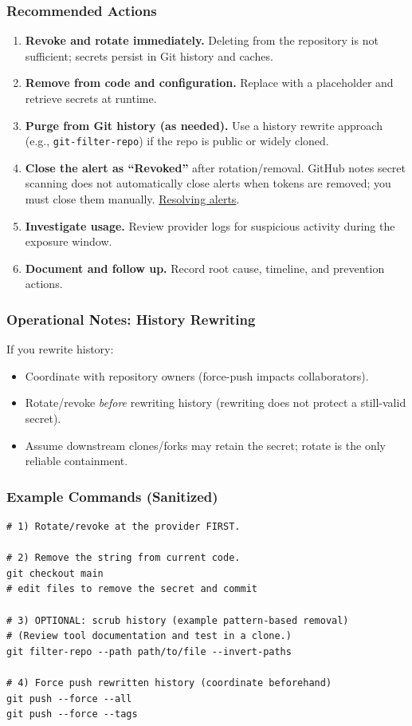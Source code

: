\documentclass[11pt]{article}
\newcommand{\code}[1]{\texttt{#1}}
\begin{document}
\subsubsection{Recommended Actions}
\begin{enumerate}
  \item \textbf{Revoke and rotate immediately.} Deleting from the repository is not sufficient; secrets persist in Git history and caches.
  \item \textbf{Remove from code and configuration.} Replace with a placeholder and retrieve secrets at runtime.
  \item \textbf{Purge from Git history (as needed).} Use a history rewrite approach (e.g., \code{git-filter-repo}) if the repo is public or widely cloned.
  \item \textbf{Close the alert as ``Revoked''} after rotation/removal. GitHub notes secret scanning does not automatically close alerts when tokens are removed; you must close them manually. \href{https://docs.github.com/code-security/secret-scanning/managing-alerts-from-secret-scanning/resolving-alerts}{Resolving alerts}.
  \item \textbf{Investigate usage.} Review provider logs for suspicious activity during the exposure window.
  \item \textbf{Document and follow up.} Record root cause, timeline, and prevention actions.
\end{enumerate}

\subsubsection{Operational Notes: History Rewriting}
If you rewrite history:
\begin{itemize}
  \item Coordinate with repository owners (force-push impacts collaborators).
  \item Rotate/revoke \emph{before} rewriting history (rewriting does not protect a still-valid secret).
  \item Assume downstream clones/forks may retain the secret; rotate is the only reliable containment.
\end{itemize}

\subsubsection{Example Commands (Sanitized)}
\begin{verbatim}
# 1) Rotate/revoke at the provider FIRST.

# 2) Remove the string from current code.
git checkout main
# edit files to remove the secret and commit

# 3) OPTIONAL: scrub history (example pattern-based removal)
# (Review tool documentation and test in a clone.)
git filter-repo --path path/to/file --invert-paths

# 4) Force push rewritten history (coordinate beforehand)
git push --force --all
git push --force --tags
\end{verbatim}
\end{document}
